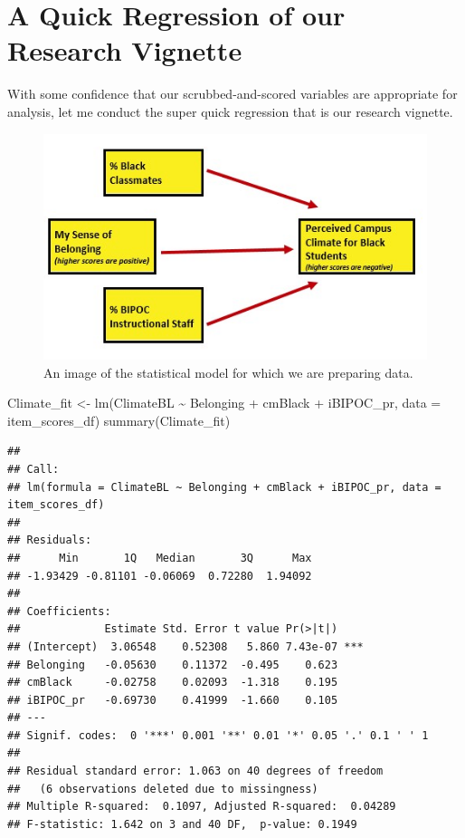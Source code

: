 \documentclass[
  11pt,
]{book}
\newenvironment{Shaded}{\begin{snugshade}}{\end{snugshade}}
\newcommand{\AttributeTok}[1]{\textcolor[rgb]{0.77,0.63,0.00}{#1}}
\newcommand{\FunctionTok}[1]{\textcolor[rgb]{0.00,0.00,0.00}{#1}}
\newcommand{\NormalTok}[1]{#1}
\newcommand{\OtherTok}[1]{\textcolor[rgb]{0.56,0.35,0.01}{#1}}
\newcommand{\SpecialCharTok}[1]{\textcolor[rgb]{0.00,0.00,0.00}{#1}}
\begin{document}
\hypertarget{a-quick-regression-of-our-research-vignette}{%
\section{A Quick Regression of our Research Vignette}\label{a-quick-regression-of-our-research-vignette}}

With some confidence that our scrubbed-and-scored variables are appropriate for analysis, let me conduct the super quick regression that is our research vignette.

\begin{figure}
\centering
\includegraphics{images/Ch04/BlStuRegression.jpg}
\caption{An image of the statistical model for which we are preparing data.}
\end{figure}

\begin{Shaded}
\begin{Highlighting}[]
\NormalTok{Climate\_fit }\OtherTok{\textless{}{-}} \FunctionTok{lm}\NormalTok{(ClimateBL }\SpecialCharTok{\textasciitilde{}}\NormalTok{ Belonging }\SpecialCharTok{+}\NormalTok{ cmBlack }\SpecialCharTok{+}\NormalTok{ iBIPOC\_pr, }\AttributeTok{data =}\NormalTok{ item\_scores\_df)}
\FunctionTok{summary}\NormalTok{(Climate\_fit)}
\end{Highlighting}
\end{Shaded}

\begin{verbatim}
## 
## Call:
## lm(formula = ClimateBL ~ Belonging + cmBlack + iBIPOC_pr, data = item_scores_df)
## 
## Residuals:
##      Min       1Q   Median       3Q      Max 
## -1.93429 -0.81101 -0.06069  0.72280  1.94092 
## 
## Coefficients:
##             Estimate Std. Error t value Pr(>|t|)    
## (Intercept)  3.06548    0.52308   5.860 7.43e-07 ***
## Belonging   -0.05630    0.11372  -0.495    0.623    
## cmBlack     -0.02758    0.02093  -1.318    0.195    
## iBIPOC_pr   -0.69730    0.41999  -1.660    0.105    
## ---
## Signif. codes:  0 '***' 0.001 '**' 0.01 '*' 0.05 '.' 0.1 ' ' 1
## 
## Residual standard error: 1.063 on 40 degrees of freedom
##   (6 observations deleted due to missingness)
## Multiple R-squared:  0.1097, Adjusted R-squared:  0.04289 
## F-statistic: 1.642 on 3 and 40 DF,  p-value: 0.1949
\end{verbatim}
\end{document}
